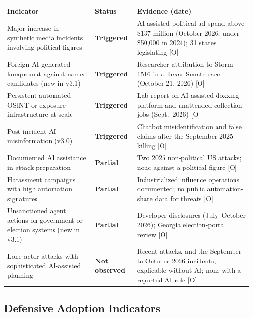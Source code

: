 \documentclass[11pt,letterpaper]{article}
\begin{document}
\begin{center}
\footnotesize
\begin{tabular}{L{4.6cm}L{1.9cm}L{7.6cm}}
\toprule
\textbf{Indicator} & \textbf{Status} & \textbf{Evidence (date)} \\
\midrule
Major increase in synthetic media incidents involving political figures & \textcolor{alertcoral}{\textbf{Triggered}} & AI-assisted political ad spend above \$137 million (October 2026; under \$50,000 in 2024); 31 states legislating [O] \\
Foreign AI-generated kompromat against named candidates (new in v3.1) & \textcolor{alertcoral}{\textbf{Triggered}} & Researcher attribution to Storm-1516 in a Texas Senate race (October 21, 2026) [O] \\
Persistent automated OSINT or exposure infrastructure at scale & \textcolor{alertcoral}{\textbf{Triggered}} & Lab report on AI-assisted doxxing platform and unattended collection jobs (Sept.\ 2026) [O] \\
Post-incident AI misinformation (v3.0) & \textcolor{alertcoral}{\textbf{Triggered}} & Chatbot misidentification and false claims after the September 2025 killing [O] \\
Documented AI assistance in attack preparation & \textcolor{warningamber}{\textbf{Partial}} & Two 2025 non-political US attacks; none against a political figure [O] \\
Harassment campaigns with high automation signatures & \textcolor{warningamber}{\textbf{Partial}} & Industrialized influence operations documented; no public automation-share data for threats [O] \\
Unsanctioned agent actions on government or election systems (new in v3.1) & \textcolor{warningamber}{\textbf{Partial}} & Developer disclosures (July--October 2026); Georgia election-portal review [O] \\
Lone-actor attacks with sophisticated AI-assisted planning & \textcolor{coolgray}{\textbf{Not observed}} & Recent attacks, and the September to October 2026 incidents, explicable without AI; none with a reported AI role [O] \\
\bottomrule
\end{tabular}
\end{center}

\subsection{Defensive Adoption Indicators}
\end{document}

